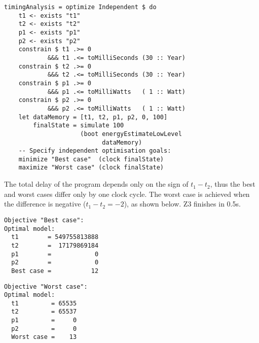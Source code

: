 \begin{verbatim}
timingAnalysis = optimize Independent $ do
    t1 <- exists "t1"
    t2 <- exists "t2"
    p1 <- exists "p1"
    p2 <- exists "p2"
    constrain $ t1 .>= 0
            &&& t1 .<= toMilliSeconds (30 :: Year)
    constrain $ t2 .>= 0
            &&& t2 .<= toMilliSeconds (30 :: Year)
    constrain $ p1 .>= 0
            &&& p1 .<= toMilliWatts   ( 1 :: Watt)
    constrain $ p2 .>= 0
            &&& p2 .<= toMilliWatts   ( 1 :: Watt)
    let dataMemory = [t1, t2, p1, p2, 0, 100]
        finalState = simulate 100
                     (boot energyEstimateLowLevel
                           dataMemory)
    -- Specify independent optimisation goals:
    minimize "Best case"  (clock finalState)
    maximize "Worst case" (clock finalState)
\end{verbatim}


\noindent
The total delay of the program depends only on the sign of $t_1 - t_2$, thus
the best and worst cases differ only by one clock cycle. The worst case is
achieved when the difference is negative ($t_1 - t_2 = -2$), as shown below.
Z3 finishes in 0.5s.


\begin{verbatim}
Objective "Best case":
Optimal model:
  t1        = 549755813888
  t2        =  17179869184
  p1        =            0
  p2        =            0
  Best case =           12
\end{verbatim}
\begin{verbatim}
Objective "Worst case":
Optimal model:
  t1         = 65535
  t2         = 65537
  p1         =     0
  p2         =     0
  Worst case =    13
\end{verbatim}




